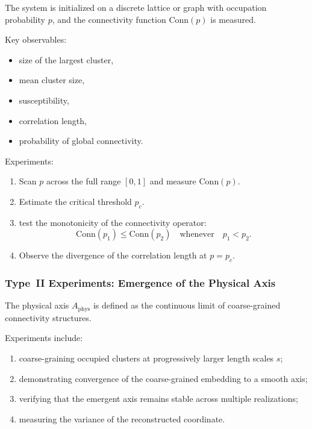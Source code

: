 The system is initialized on a discrete lattice or graph with occupation
probability $p$, and the connectivity function $\mathrm{Conn}(p)$ is measured.

Key observables:

\begin{itemize}
    \item size of the largest cluster,
    \item mean cluster size,
    \item susceptibility,
    \item correlation length,
    \item probability of global connectivity.
\end{itemize}

Experiments:

\begin{enumerate}
    \item Scan $p$ across the full range $[0,1]$ and measure $\mathrm{Conn}(p)$.
    \item Estimate the critical threshold $p_c$.
    \item test the monotonicity of the connectivity operator:
          \[
             \mathrm{Conn}(p_1) \le \mathrm{Conn}(p_2)
             \quad \text{whenever} \quad p_1 < p_2.
          \]
    \item Observe the divergence of the correlation length at $p = p_c$.
\end{enumerate}



\subsubsection{Type~II Experiments: Emergence of the Physical Axis}

The physical axis $A_{\mathrm{phys}}$ is defined as the continuous limit of
coarse-grained connectivity structures.

Experiments include:

\begin{enumerate}
    \item coarse-graining occupied clusters at progressively larger length
          scales $s$;
    \item demonstrating convergence of the coarse-grained embedding to a
          smooth axis;
    \item verifying that the emergent axis remains stable across multiple
          realizations;
    \item measuring the variance of the reconstructed coordinate.
\end{enumerate}

